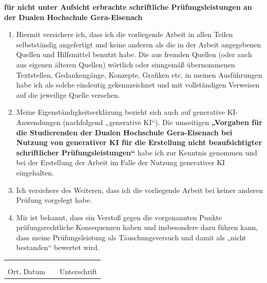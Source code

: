 \begin{flushleft}
    \vspace*{1cm}
            \textbf{für nicht unter Aufsicht erbrachte schriftliche Prüfungsleistungen
an der Dualen Hochschule Gera-Eisenach} \\
    \vspace*{1cm}
\begin{enumerate}[leftmargin=0.5cm]
    \item Hiermit versichere ich, dass ich die vorliegende Arbeit in allen Teilen selbstständig angefertigt und keine anderen als die in der Arbeit angegebenen Quellen und Hilfsmittel benutzt habe. Die aus fremden Quellen (oder auch aus eigenen älteren Quellen) wörtlich oder sinngemäß übernommenen Textstellen, Gedankengänge, Konzepte, Grafiken etc. in meinen Ausführungen habe ich als solche eindeutig gekennzeichnet und mit vollständigen Verweisen auf die jeweilige Quelle versehen.
    \item Meine Eigenständigkeitserklärung bezieht sich auch auf generative KI-Anwendungen (nachfolgend „generative KI“). Die umseitigen \textbf{„Vorgaben für die Studierenden der Dualen Hochschule Gera-Eisenach bei Nutzung von generativer KI für die Erstellung nicht beaufsichtigter schriftlicher Prüfungsleistungen“} habe ich zur Kenntnis genommen und bei der Erstellung der Arbeit im Falle der Nutzung generativer KI eingehalten.
    \item Ich versichere des Weiteren, dass ich die vorliegende Arbeit bei keiner anderen Prüfung vorgelegt habe.
    \item Mir ist bekannt, dass ein Verstoß gegen die vorgenannten Punkte prüfungsrechtliche Konsequenzen haben und insbesondere dazu führen kann, dass meine Prüfungsleistung als Täuschungsversuch und damit als „nicht bestanden“ bewertet wird.
\end{enumerate}
\end{flushleft}
\vspace*{\fill}
\begin{tabular} {lrl}
    \hspace{5.5cm} & \hspace{3cm} & \hspace{5.5cm} \\
    \hrulefill & & \hrulefill \\
    Ort, Datum & & Unterschrift
\end{tabular}
\vspace*{\fill}

\cleardoublepage
